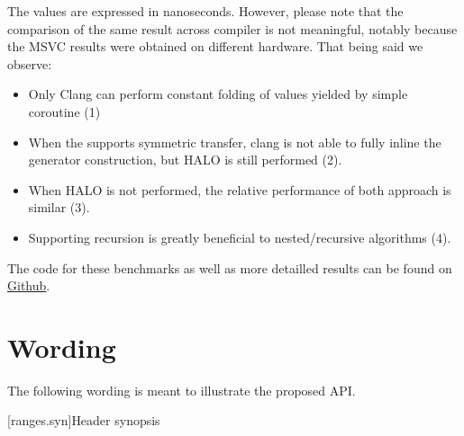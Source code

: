\documentclass{wg21}
\begin{document}
The values are expressed in nanoseconds. However, please note that the comparison of the same result across compiler is not meaningful, notably because the MSVC results were obtained on different hardware.
That being said we observe:

\begin{itemize}
    \item Only Clang can perform constant folding of values yielded by simple coroutine (1)
    \item When the  supports symmetric transfer, clang is not able to fully inline the generator construction, but HALO is still performed (2).
    \item When HALO is not performed, the relative performance of both approach is similar (3).
    \item Supporting recursion is greatly beneficial to nested/recursive algorithms (4).
\end{itemize}

The code for these benchmarks as well as more detailled results can be found on \href{https://github.com/cor3ntin/coro_benchmark}{Github}.


\section{Wording}

The following wording is meant to illustrate the proposed API.



[ranges.syn]{Header  synopsis}
\end{document}
